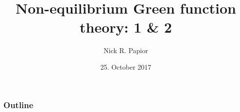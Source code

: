 


\graphicspath{{fig/}{fig-defence/}{paper-fig/}}
\usepackage[export]{adjustbox}


\usetikzlibrary{calc}

\usepackage{algorithm}
\usepackage{algpseudocode}

\date{25. October 2017}
\title{Non-equilibrium Green function theory: 1 \& 2}
\author{Nick R. Papior}

\usepackage{animate}



\begin{frame}
  \titlepage
\end{frame}

\begin{frame}
  \frametitle{Outline}
  \tableofcontents
\end{frame}


\def\matsize{.8cm}
\def\Full{\begin{tikzpicture}
      \fill (0,0) rectangle (\matsize,\matsize);
    \end{tikzpicture}
}
\def\Left{\begin{tikzpicture}
      \draw (0,0) rectangle (\matsize,\matsize);
      \fill (0,\matsize) rectangle ++(.3*\matsize,-.3*\matsize);
    \end{tikzpicture}
}
\def\FullLeft{\begin{tikzpicture}
      \draw (0,0) rectangle (\matsize,\matsize);
      \fill (0,0) rectangle (.3*\matsize,\matsize);
    \end{tikzpicture}
}

\def\drawcube[#1]{%
    \path[#1] (0,0,0) -- (0,0,1);
    \path[#1] (0,0,0) -- (1,0,0);
    \path[#1] (0,0,0) -- (0,1,0);
    \path[#1] (1,0,0) -- (1,1,0);
    \path[#1] (1,0,0) -- (1,0,1);
    \path[#1] (0,1,0) -- (1,1,0);
    \path[#1] (0,1,0) -- (0,1,1);
    \path[#1] (0,0,1) -- (1,0,1);
    \path[#1] (0,0,1) -- (0,1,1);
    \path[#1] (1,1,0) -- (1,1,1);
    \path[#1] (1,1,1) -- (0,1,1);
    \path[#1] (1,1,1) -- (1,0,1);
}








